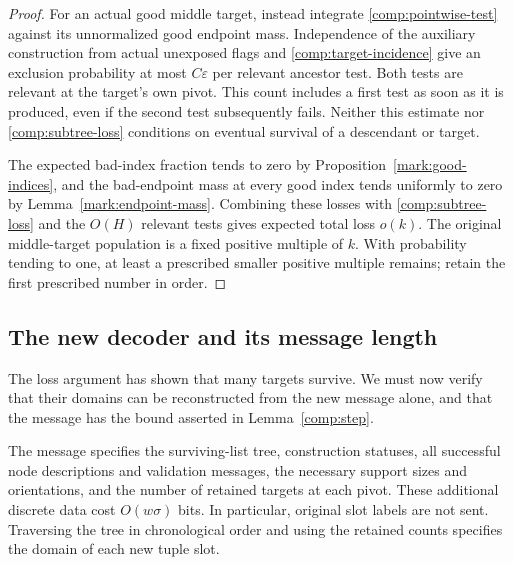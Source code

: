 \begin{proof}
For an actual good middle target, instead integrate
\eqref{comp:pointwise-test} against its unnormalized good
endpoint mass. Independence of the auxiliary construction
from actual unexposed flags and
\eqref{comp:target-incidence} give an exclusion probability
at most \(C\varepsilon\) per relevant ancestor test.
Both tests are relevant at the target's own pivot.
This count includes a first test as soon as it is
produced, even if the second test subsequently fails.
Neither this estimate nor \eqref{comp:subtree-loss}
conditions on eventual survival of a descendant or target.

The expected bad-index fraction tends to zero by
Proposition~\ref{mark:good-indices}, and the bad-endpoint
mass at every good index tends uniformly to zero by
Lemma~\ref{mark:endpoint-mass}.
Combining these losses with \eqref{comp:subtree-loss}
and the \(O(H)\) relevant tests gives expected total
loss \(o(k)\).
The original middle-target population is a fixed positive
multiple of \(k\). With probability tending to one,
at least a prescribed smaller positive multiple remains;
retain the first prescribed number in order.
\end{proof}

\subsection{The new decoder and its message length}

The loss argument has shown that many targets survive.
We must now verify that their domains can be reconstructed
from the new message alone, and that the message has the
bound asserted in Lemma~\ref{comp:step}.

The message specifies the surviving-list tree, construction
statuses, all successful node descriptions and validation
messages, the necessary support sizes and orientations,
and the number of retained targets at each pivot.
These additional discrete data cost \(O(w\sigma)\) bits.
In particular, original slot labels are not sent.
Traversing the tree in chronological order and using the
retained counts specifies the domain of each new tuple
slot.

